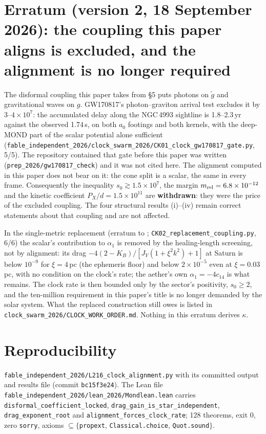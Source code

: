 \documentclass[11pt,letterpaper]{article}
\begin{document}
\section*{Erratum (version 2, 18 September 2026): the coupling this paper aligns is excluded, and the alignment is no longer required}
The disformal coupling this paper takes from \cite{paper24} \S5 puts photons on $\tilde g$ and gravitational waves on $g$. GW170817's photon--graviton arrival test excludes it by $3$--$4\times10^{7}$: the accumulated delay along the NGC\,4993 sightline is 1.8--2.3\,yr against the observed 1.74\,s, on both $a_0$ footings and both kernels, with the deep-MOND part of the scalar potential alone sufficient (\texttt{fable\_independent\_2026/}\allowbreak\texttt{clock\_swarm\_2026/}\allowbreak\texttt{CK01\_clock\_gw170817\_gate.py}, 5/5). The repository contained that gate before this paper was written (\texttt{prep\_2026/gw170817\_check}) and it was not cited here. The alignment computed in this paper does not bear on it: the cone split is a scalar, the same in every frame. Consequently the inequality $s_0\gtrsim1.5\times10^{7}$, the margin $m_{\rm rel}=6.8\times10^{-12}$ and the kinetic coefficient $P_X/d=1.5\times10^{11}$ are \textbf{withdrawn}: they were the price of the excluded coupling. The four structural results (i)--(iv) remain correct statements about that coupling and are not affected.

In the single-metric replacement (erratum to \cite{paper24}; \texttt{CK02\_replacement\_coupling.py}, 6/6) the scalar's contribution to $\alpha_1$ is removed by the healing-length screening, not by alignment: its drag $-4(2-K_B)/[J_Y(1+\xi^2k^2)+1]$ at Saturn is below $10^{-9}$ for $\xi=4$\,pc (the ephemeris floor) and below $2\times10^{-5}$ even at $\xi=0.03$\,pc, with no condition on the clock's rate; the aether's own $\alpha_1=-4c_{14}$ is what remains. The clock rate is then bounded only by the sector's positivity, $s_0\ge2$, and the ten-million requirement in this paper's title is no longer demanded by the solar system. What the replaced construction still owes is listed in \texttt{clock\_swarm\_2026/}\allowbreak\texttt{CLOCK\_WORK\_ORDER.md}. Nothing in this erratum derives $\kappa$.

\section{Reproducibility}
\texttt{fable\_independent\_2026/L216\_clock\_alignment.py} with its committed output and results file (commit \texttt{bc15f3e24}). The Lean file \texttt{fable\_independent\_2026/lean\_2026/Mondlean.lean} carries \texttt{disformal\_coefficient\_locked}, \texttt{drag\_gain\_is\_star\_independent}, \texttt{drag\_exponent\_root} and \texttt{alignment\_forces\_clock\_rate}; 128 theorems, exit 0, zero \texttt{sorry}, axioms $\subseteq\{$\texttt{propext}, \texttt{Classical.choice}, \texttt{Quot.sound}$\}$.
\end{document}
